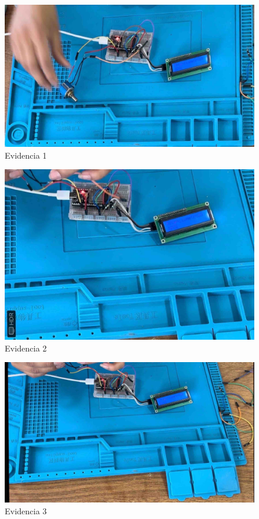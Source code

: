     \begin{figure}[H]
        \centering
        \includegraphics[trim = {0mm 0mm 0mm 0mm},clip,scale=0.2]{8/Img/Evidencia 1.pdf}
        \caption{Evidencia 1}
        \label{Evidencia 1}
    \end{figure}
    
    \begin{figure}[H]
        \centering
        \includegraphics[trim = {0mm 0mm 0mm 0mm},clip,scale=0.2]{8/Img/Evidencia 2.pdf}
        \caption{Evidencia 2}
        \label{Evidencia 2}
    \end{figure}
    
    \begin{figure}[H]
        \centering
        \includegraphics[trim = {0mm 0mm 0mm 0mm},clip,scale=0.2]{8/Img/Evidencia 3.pdf}
        \caption{Evidencia 3}
        \label{Evidencia 3}
    \end{figure}
    
